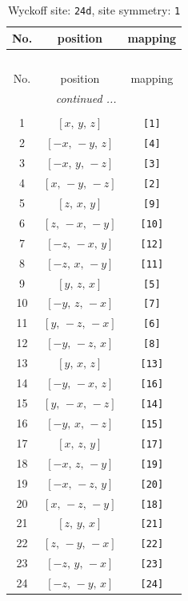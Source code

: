 \documentclass[fleqn,8pt]{jsarticle}
\begin{document}
\begin{longtable}{ccc}
\caption{Wyckoff site: {\tt 24d}, site symmetry: {\tt 1}}
 \\
 \hline \hline
No. & position & mapping \\ \hline \endfirsthead

\multicolumn{2}{l}{\tablename\ \thetable{}} \\
 \hline \hline
No. & position & mapping \\ \hline \endhead

 \hline \hline
\multicolumn{2}{r}{\footnotesize\it continued ...} \\ \endfoot

 \hline \hline
\multicolumn{2}{r}{} \\ \endlastfoot

1 & $\left[ x,\, y,\, z \right]$ & {\tt [1]} \\ \hline
2 & $\left[ - x,\, - y,\, z \right]$ & {\tt [4]} \\ \hline
3 & $\left[ - x,\, y,\, - z \right]$ & {\tt [3]} \\ \hline
4 & $\left[ x,\, - y,\, - z \right]$ & {\tt [2]} \\ \hline
5 & $\left[ z,\, x,\, y \right]$ & {\tt [9]} \\ \hline
6 & $\left[ z,\, - x,\, - y \right]$ & {\tt [10]} \\ \hline
7 & $\left[ - z,\, - x,\, y \right]$ & {\tt [12]} \\ \hline
8 & $\left[ - z,\, x,\, - y \right]$ & {\tt [11]} \\ \hline
9 & $\left[ y,\, z,\, x \right]$ & {\tt [5]} \\ \hline
10 & $\left[ - y,\, z,\, - x \right]$ & {\tt [7]} \\ \hline
11 & $\left[ y,\, - z,\, - x \right]$ & {\tt [6]} \\ \hline
12 & $\left[ - y,\, - z,\, x \right]$ & {\tt [8]} \\ \hline
13 & $\left[ y,\, x,\, z \right]$ & {\tt [13]} \\ \hline
14 & $\left[ - y,\, - x,\, z \right]$ & {\tt [16]} \\ \hline
15 & $\left[ y,\, - x,\, - z \right]$ & {\tt [14]} \\ \hline
16 & $\left[ - y,\, x,\, - z \right]$ & {\tt [15]} \\ \hline
17 & $\left[ x,\, z,\, y \right]$ & {\tt [17]} \\ \hline
18 & $\left[ - x,\, z,\, - y \right]$ & {\tt [19]} \\ \hline
19 & $\left[ - x,\, - z,\, y \right]$ & {\tt [20]} \\ \hline
20 & $\left[ x,\, - z,\, - y \right]$ & {\tt [18]} \\ \hline
21 & $\left[ z,\, y,\, x \right]$ & {\tt [21]} \\ \hline
22 & $\left[ z,\, - y,\, - x \right]$ & {\tt [22]} \\ \hline
23 & $\left[ - z,\, y,\, - x \right]$ & {\tt [23]} \\ \hline
24 & $\left[ - z,\, - y,\, x \right]$ & {\tt [24]} \\
\end{longtable}
\end{document}

